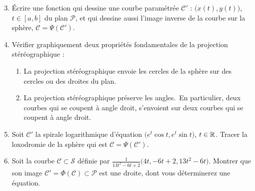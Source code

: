 \begin{frame}
\begin{tp}
\begin{enumerate}   
\setcounter{enumi}{2} 
  \item \'Ecrire une fonction qui dessine une courbe paramétrée $\mathcal{C}'$ : $\big( x(t),y(t) \big)$, $t\in[a,b]$
  du plan $\mathcal{P}$, et qui dessine aussi l'image inverse de la courbe sur la sphère, $\mathcal{C} = 
  \Psi(\mathcal{C}')$.
 
  
  \item Vérifier graphiquement deux propriétés fondamentales de la projection stéréographique :
  \begin{enumerate}
    \item \og La projection stéréographique envoie les cercles de la sphère sur des cercles ou des droites du plan.\fg
    \item \og La projection stéréographique préserve les angles.\fg\ En particulier, deux courbes qui se coupent
    à angle droit, s'envoient sur deux courbes qui se coupent à angle droit.
  \end{enumerate}
  
  \item Soit $\mathcal{C}'$ la spirale logarithmique d'équation
  $\big( e^t \cos t, e^t \sin t \big)$, $t \in \mathbb{R}$.
  Tracer la loxodromie de la sphère qui est $\mathcal{C} = 
  \Psi(\mathcal{C}')$. 
  
  \item  Soit la courbe $\mathcal{C} \subset \mathcal{S}$
  définie par $\frac{1}{13t^2 - 6t + 2}\big(4t, -6t + 2, 13t^2 - 6t\big)$.
  Montrer que son image $\mathcal{C}' = \Phi(\mathcal{C}) \subset \mathcal{P}$
  est une droite, dont vous déterminerez une équation.
  
\end{enumerate}

\end{tp}
\end{frame}



